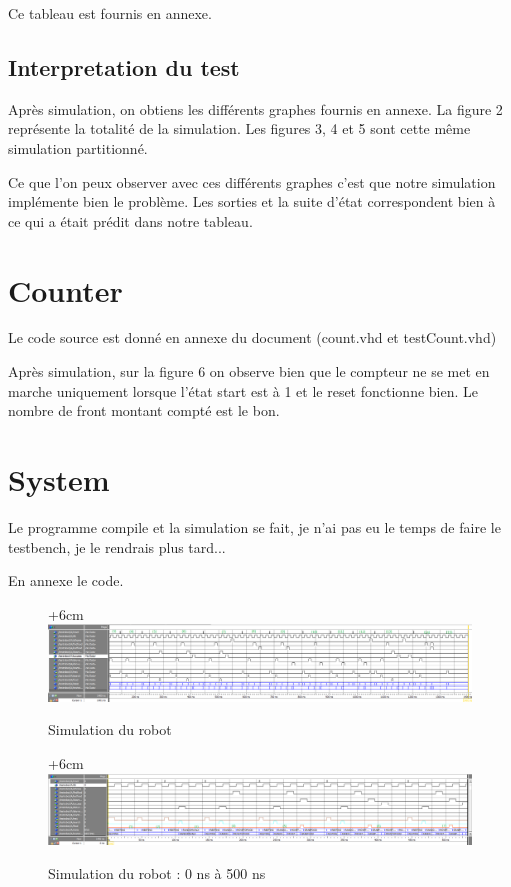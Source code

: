 \documentclass{article}
\begin{document}
Ce tableau est fournis en annexe. 
\subsection{Interpretation du test}

Après simulation, on obtiens les différents graphes fournis en annexe. La figure 2 représente la totalité de la simulation. Les figures 3, 4 et 5 sont cette même simulation partitionné. 

Ce que l'on peux observer avec ces différents graphes c'est que notre simulation implémente bien le problème. Les sorties  et la suite d'état correspondent bien à ce qui a était prédit dans notre tableau.

\section{Counter}
Le code source est donné en annexe du document (count.vhd et testCount.vhd)

Après simulation, sur la figure 6 on observe bien que le compteur ne se met en marche uniquement lorsque l'état start est à 1 et le reset fonctionne bien. Le nombre de front montant compté est le bon.

\section{System}
Le programme compile et la simulation se fait, je n'ai pas eu le temps de faire le testbench, je le rendrais plus tard...

En annexe le code.













\begin{figure}[!h]
\advance\leftskip+6cm
\includegraphics[scale=0.50, angle=-90]{TestRobotMain.PNG}
\caption{Simulation du robot}
\end{figure}

\begin{figure}[!h]
\advance\leftskip+6cm
\includegraphics[scale=0.50, angle=-90]{detail_part1.PNG}
\caption{Simulation du robot : 0 ns à 500 ns}
\end{figure}
\end{document}
